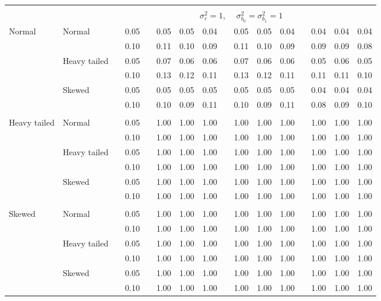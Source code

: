 \begin{table}[ht]
\begin{scriptsize}
\begin{center}
\begin{tabular}{ll p{.1cm} c p{.1cm} rrr p{.1cm} rrr p{.1cm} rrr}
&&&&&&&&&&&&&&&\\
& && && \multicolumn{9}{c}{$\sigma_{\varepsilon}^2 = 1$, \ \ $\sigma_{b_0}^2 = \sigma_{b_1}^2 = 1$} \\ \cline{6-16}

\rowcolor{gray!20} Normal       & Normal       && 0.05 &&  0.05 & 0.05 & 0.04 && 0.05 & 0.05 & 0.04 && 0.04 & 0.04 & 0.04 \\ 
\rowcolor{gray!20}              &              && 0.10 &&  0.11 & 0.10 & 0.09 && 0.11 & 0.10 & 0.09 && 0.09 & 0.09 & 0.08 \\ 
\rowcolor{gray!20}              & Heavy tailed && 0.05 &&  0.07 & 0.06 & 0.06 && 0.07 & 0.06 & 0.06 && 0.05 & 0.06 & 0.05 \\ 
\rowcolor{gray!20}              &              && 0.10 &&  0.13 & 0.12 & 0.11 && 0.13 & 0.12 & 0.11 && 0.11 & 0.11 & 0.10 \\ 
\rowcolor{gray!20}              & Skewed       && 0.05 &&  0.05 & 0.05 & 0.05 && 0.05 & 0.05 & 0.05 && 0.04 & 0.04 & 0.04 \\ 
\rowcolor{gray!20}              &              && 0.10 &&  0.10 & 0.09 & 0.11 && 0.10 & 0.09 & 0.11 && 0.08 & 0.09 & 0.10 \\ 
              &&&&&&&&&&&&&&&\\
 Heavy tailed & Normal       && 0.05 &&  1.00 & 1.00 & 1.00 && 1.00 & 1.00 & 1.00 && 1.00 & 1.00 & 1.00 \\ 
              &              && 0.10 &&  1.00 & 1.00 & 1.00 && 1.00 & 1.00 & 1.00 && 1.00 & 1.00 & 1.00 \\ 
              & Heavy tailed && 0.05 &&  1.00 & 1.00 & 1.00 && 1.00 & 1.00 & 1.00 && 1.00 & 1.00 & 1.00 \\ 
              &              && 0.10 &&  1.00 & 1.00 & 1.00 && 1.00 & 1.00 & 1.00 && 1.00 & 1.00 & 1.00 \\ 
              & Skewed       && 0.05 &&  1.00 & 1.00 & 1.00 && 1.00 & 1.00 & 1.00 && 1.00 & 1.00 & 1.00 \\ 
              &              && 0.10 &&  1.00 & 1.00 & 1.00 && 1.00 & 1.00 & 1.00 && 1.00 & 1.00 & 1.00 \\ 
              &&&&&&&&&&&&&&&\\
 Skewed       & Normal       && 0.05 &&  1.00 & 1.00 & 1.00 && 1.00 & 1.00 & 1.00 && 1.00 & 1.00 & 1.00 \\ 
              &              && 0.10 &&  1.00 & 1.00 & 1.00 && 1.00 & 1.00 & 1.00 && 1.00 & 1.00 & 1.00 \\ 
              & Heavy tailed && 0.05 &&  1.00 & 1.00 & 1.00 && 1.00 & 1.00 & 1.00 && 1.00 & 1.00 & 1.00 \\ 
              &              && 0.10 &&  1.00 & 1.00 & 1.00 && 1.00 & 1.00 & 1.00 && 1.00 & 1.00 & 1.00 \\ 
              & Skewed       && 0.05 &&  1.00 & 1.00 & 1.00 && 1.00 & 1.00 & 1.00 && 1.00 & 1.00 & 1.00 \\ 
              &              && 0.10 &&  1.00 & 1.00 & 1.00 && 1.00 & 1.00 & 1.00 && 1.00 & 1.00 & 1.00 \\ 


\end{tabular}
\end{center}
\end{scriptsize}
\end{table}

